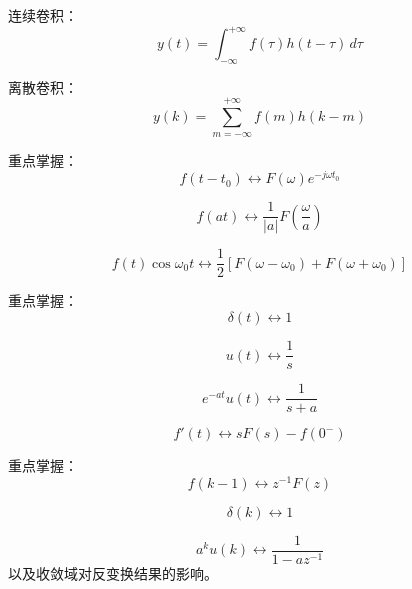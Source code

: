 \documentclass[UTF8]{ctexart}
\begin{document}
\begin{tcolorbox}[colback=red!5!white,colframe=red!60!black,title=重点三：卷积]
连续卷积：
\[
y(t)=\int_{-\infty}^{+\infty}f(\tau)h(t-\tau)\,d\tau
\]

离散卷积：
\[
y(k)=\sum_{m=-\infty}^{+\infty}f(m)h(k-m)
\]
\end{tcolorbox}

\begin{tcolorbox}[colback=red!5!white,colframe=red!60!black,title=重点四：傅里叶变换]
重点掌握：
\[
f(t-t_0)\leftrightarrow F(\omega)e^{-j\omega t_0}
\]

\[
f(at)\leftrightarrow \frac{1}{|a|}F\left(\frac{\omega}{a}\right)
\]

\[
f(t)\cos\omega_0t
\leftrightarrow
\frac{1}{2}\left[F(\omega-\omega_0)+F(\omega+\omega_0)\right]
\]
\end{tcolorbox}

\begin{tcolorbox}[colback=red!5!white,colframe=red!60!black,title=重点五：拉普拉斯变换]
重点掌握：
\[
\delta(t)\leftrightarrow 1
\]

\[
u(t)\leftrightarrow \frac{1}{s}
\]

\[
e^{-at}u(t)\leftrightarrow \frac{1}{s+a}
\]

\[
f'(t)\leftrightarrow sF(s)-f(0^-)
\]
\end{tcolorbox}

\begin{tcolorbox}[colback=red!5!white,colframe=red!60!black,title=重点六：$Z$ 变换]
重点掌握：
\[
f(k-1)\leftrightarrow z^{-1}F(z)
\]

\[
\delta(k)\leftrightarrow 1
\]

\[
a^ku(k)\leftrightarrow \frac{1}{1-az^{-1}}
\]
以及收敛域对反变换结果的影响。
\end{tcolorbox}
\end{document}

